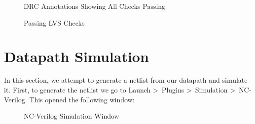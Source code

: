 \documentclass{article}
\begin{document}
	\begin{figure}[H]
		\centerline{}
		\caption{DRC Annotations Showing All Checks Passing}
		\label{fig::datapath_drc}
	\end{figure}
	
	\begin{figure}[H]
		\centerline{}
		\caption{Passing LVS Checks}
		\label{fig::datapath_lvs}
	\end{figure}
	
	\section{Datapath Simulation}
	
	In this section, we attempt to generate a netlist from our datapath and simulate it. First, to generate the netlist we go to Launch \textgreater\ Plugins \textgreater\ Simulation \textgreater\ NC-Verilog. This opened the following window:
	
	\begin{figure}[H]
		\centerline{}
		\caption{NC-Verilog Simulation Window}
		\label{fig::nc_verilog_sim}
	\end{figure}
	
\end{document}
